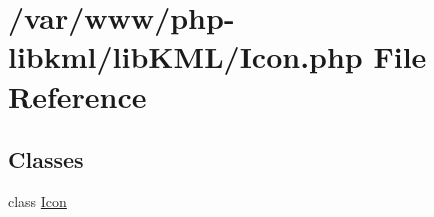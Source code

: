 \hypertarget{Icon_8php}{
\section{/var/www/php-\/libkml/libKML/Icon.php File Reference}
\label{d9/d17/Icon_8php}
}
\subsection*{Classes}
\begin{DoxyCompactItemize}
\item 
class \hyperlink{classIcon}{Icon}
\end{DoxyCompactItemize}
